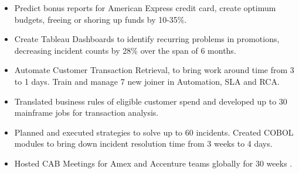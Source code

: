 \documentclass[10pt,a4paper]{altacv}
\begin{document}

\begin{fullwidth}
\makecvheader
\end{fullwidth}



\begin{itemize}
\item Predict bonus reports for American Express credit card, create optimum budgets, freeing or shoring up funds by 10-35\%.
\item Create Tableau Dashboards to identify recurring problems in promotions, decreasing incident counts by 28\% over the span of 6 months.
\item Automate Customer Transaction Retrieval, to bring work around time from 3 to 1 days. Train and manage 7 new joiner in Automation, SLA and RCA.
\end{itemize}

\divider

\begin{itemize}
\item Translated business rules of eligible customer spend and developed up to 30 mainframe jobs for transaction analysis.
\item Planned and executed strategies to solve up to 60 incidents. Created COBOL modules to bring down incident resolution time from 3 weeks to 4 days.
\item Hosted CAB Meetings for Amex and Accenture teams globally for 30 weeks .
\end{itemize}
\end{document}
